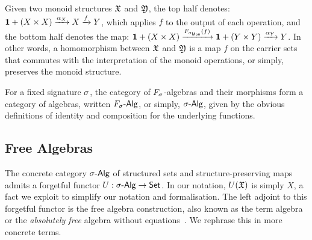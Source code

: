 \begin{example}
    Given two monoid structures \(\mathfrak{X}\) and \(\mathfrak{Y}\), the top half denotes:
    \({{\mathbf{1}} + (X \times X) \xrightarrow{\alpha_{X}} X \xrightarrow{f} Y}\), which applies \(f\) to the output of each operation,
    and the bottom half denotes the map:
    \({\unitt + (X \times X) \xto{\SigMon(f)} \unitt + (Y \times Y) \xto{\alpha_{Y}} Y}\).
    In other words, a homomorphism between \(\mathfrak{X}\) and \(\mathfrak{Y}\) is a map $f$ on the carrier sets that commutes with the
    interpretation of the monoid operations, or simply, preserves the monoid structure.
\end{example}
%
For a fixed signature $\sigma$,
the category of $\Sig$-algebras and their morphisms form a category of algebras,
written $\SigAlg$, or simply, $\sigAlg$,
given by the obvious definitions of identity and composition for the underlying functions.

\subsection{Free Algebras}
\label{sec:universal-algebra:free-algebras}

The concrete category $\sigAlg$ of structured sets and structure-preserving maps
admits a forgetful functor $U : \sigAlg \to \Set$.
%
In our notation, $U(\mathfrak{X})$ is simply $X$, a fact we exploit to simplify our notation and formalisation.
%
The left adjoint to this forgetful functor is the free algebra construction,
also known as the term algebra or the \emph{absolutely free} algebra without equations~\cite{reiterman1991free}.
%
We rephrase this in more concrete terms.

